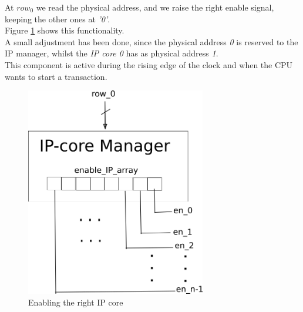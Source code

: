 At $ row_0 $ we read the physical address, and we raise the right enable signal, keeping the other ones at \textit{'0'}.\\
Figure \ref{fig:en_IP} shows this functionality.\\
\bigskip
A small adjustment has been done, since the physical address \textit{0} is reserved to the IP manager, whilst the  \textit{IP core 0 } has as physical address \textit{1}.\\
\bigskip
This component is active during the rising edge of the clock and when the CPU wants to start a transaction.
\begin{figure}[h!]
	\centering	
	\includegraphics[width=0.7\textwidth]{imm/ip_func/enable_ip.png}  
	\caption{Enabling the right IP core} 
	\label{fig:en_IP}
\end{figure}

\clearpage
